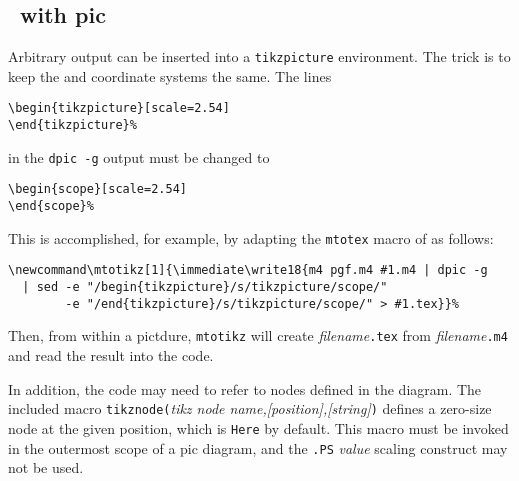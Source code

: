 \subsection{\Tikz\ with pic}\label{Tikzwithpic:}
Arbitrary \pic output can be inserted into a {\tt \bsl{}tikzpicture} 
environment.  The trick is to keep the \pic and \Tikz coordinate systems
the same.
The lines

\vspace{\parsep}
\noindent\verb|\begin{tikzpicture}[scale=2.54]|\\
\noindent\verb|\end{tikzpicture}%|
\vspace{\parsep}

\noindent in the {\tt dpic -g} output must be changed to

\vspace{\parsep}
\noindent\verb|\begin{scope}[scale=2.54]|\\
\noindent\verb|\end{scope}%|
\vspace{\parsep}

This is accomplished, for example, by adapting the {\tt \bsl{}mtotex}
macro of  as follows:

\vspace{\parsep}
\noindent
\verb^\newcommand\mtotikz[1]{\immediate\write18{m4 pgf.m4 #1.m4 | dpic -g^\\
\verb^  | sed -e "/begin{tikzpicture}/s/tikzpicture/scope/"^\\
\verb^        -e "/end{tikzpicture}/s/tikzpicture/scope/" > #1.tex}}%^\break

Then, from within a \Tikz pictdure, 
{\tt \bsl{}mtotikz\rbr}
will create {\sl filename}{\tt .tex} from {\sl filename}{\tt .m4}
and read the result into the \Tikz code.

In addition, the \Tikz code may need to refer to nodes defined in
the \pic diagram.
The included \Mfour macro
{\tt tikznode(}{\sl tikz node name,[position],[string]}{\tt)}
defines a zero-size \Tikz node at the given \pic position, which is
{\tt Here} by default.
This macro must be
invoked in the outermost scope of a pic diagram, and the
{\tt .PS} {\sl value} scaling construct may not be used. 

